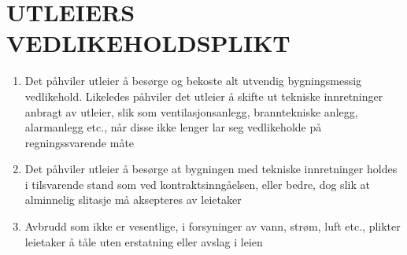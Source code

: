 \section{UTLEIERS VEDLIKEHOLDSPLIKT}


    \begin{enumerate}

        \item Det påhviler utleier å besørge og bekoste alt utvendig bygningsmessig vedlikehold. Likeledes påhviler
        det utleier å skifte ut tekniske innretninger anbragt av utleier, slik som ventilasjonsanlegg,
        branntekniske anlegg, alarmanlegg etc., når disse ikke lenger lar seg vedlikeholde på regningssvarende
        måte

        \item Det påhviler utleier å besørge at bygningen med tekniske innretninger holdes i tilsvarende stand som
        ved kontraktsinngåelsen, eller bedre, dog slik at alminnelig slitasje må aksepteres av leietaker

        \item Avbrudd som ikke er vesentlige, i forsyninger av vann, strøm, luft etc., plikter leietaker å tåle uten
        erstatning eller avslag i leien

    \end{enumerate}
